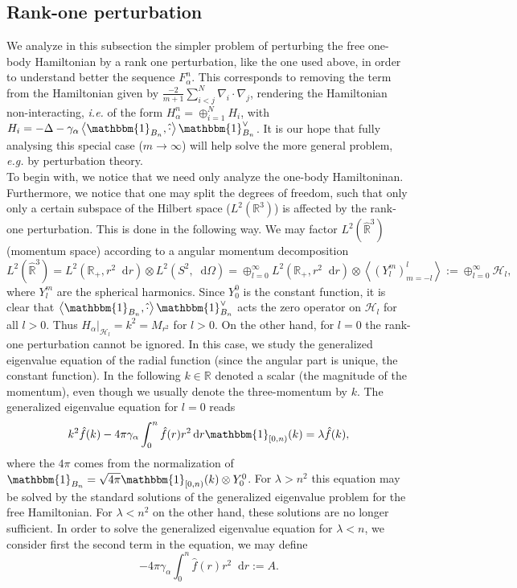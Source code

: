 \documentclass[a4paper,11pt]{article}
\renewcommand{\braket}[1]{\left\langle#1\right\rangle}
\newcommand*\diff{\mathop{}\!\mathrm{d}}
\newcommand{\ie}{\emph{i.e.} }
\newcommand{\eg}{\emph{e.g.} }
\newcommand{\R}{\mathbb{R}}
\numberwithin{equation}{section}
\begin{document}
	\subsection{Rank-one perturbation}\label{SectionRankOnePerturbation}
	We analyze in this subsection the simpler problem of perturbing the free one-body Hamiltonian by a rank one perturbation, like the one used above, in order to understand better the sequence $ F_\alpha^n $. This corresponds to removing the term from the Hamiltonian given by $ \frac{-2}{m+1}\sum_{i<j}^{N}\nabla_i\cdot\nabla_j $, rendering the Hamiltonian non-interacting, \ie of the form $ H_\alpha^n=\oplus_{i=1}^{N}H_i$, with $ H_i=-\Delta-\gamma_\alpha\braket{\mathbbm{1}_{B_n},\hat{\cdot}}\mathbbm{1}_{B_n}^\vee $. It is our hope that fully analysing this special case ($ m\to\infty $) will help solve the more general problem, \eg by perturbation theory.\\
	To begin with, we notice that we need only analyze the one-body Hamiltoninan. Furthermore, we notice that one may split the degrees of freedom, such that only only a certain subspace of the Hilbert space ($ L^2(\R^3) $) is affected by the rank-one perturbation. This is done in the following way. We may factor $ L^2(\hat{\R}^3) $ (momentum space) according to a angular momentum decomposition \begin{equation}
		L^2(\hat{\R}^3)=L^2(\R_+,r^2\diff r)\otimes L^2(S^2,\diff\Omega)=\oplus_{l=0}^{\infty}L^2(\R_+,r^2\diff r)\otimes\braket{(Y^m_l)_{m=-l}^{l}}:=\oplus_{l=0}^{\infty}\mathcal{H}_l,
	\end{equation} 
	where $ Y_l^m $ are the spherical harmonics. Since $ Y_0^0 $ is the constant function, it is clear that $ \braket{\mathbbm{1}_{B_n},\hat{\cdot}}\mathbbm{1}_{B_n}^\vee $ acts the zero operator on $ \mathcal{H}_l $ for all $ l>0 $. Thus $ H_\alpha \rvert_{\mathcal{H}_l}=k^2=M_{r^2} $ for $ l>0 $. On the other hand, for $ l=0 $ the rank-one perturbation cannot be ignored. In this case, we study the generalized eigenvalue equation of the radial function (since the angular part is unique, the constant function). In the following $ k\in\R $ denoted a scalar (the magnitude of the momentum), even though we usually denote the three-momentum by $ k $. The generalized eigenvalue equation for $ l=0 $ reads\begin{equation}\label{GeneralizedEigenvalueEq}
	k^2\hat{f}(k)-4\pi\gamma_\alpha\int_{0}^{n}\hat{f}(r)r^2\diff r\mathbbm{1}_{[0,n)}(k)=\lambda\hat{f}(k),
	\end{equation}
	where the $ 4\pi $ comes from the normalization of $ \mathbbm{1}_{B_n}=\sqrt{4\pi}\mathbbm{1}_{[0,n)}(k)\otimes Y_0^0 $. For $ \lambda>n^2 $ this equation may be solved by the standard solutions of the generalized eigenvalue problem for the free Hamiltonian. For $ \lambda<n^2 $ on the other hand, these solutions are no longer sufficient. In order to solve the generalized eigenvalue equation for $ \lambda<n $, we consider first the second term in the equation, we may define\begin{equation} \label{EqConsistency}
	-4\pi\gamma_\alpha\int_{0}^{n}\hat{f}(r)r^2\diff r:=A.
	\end{equation}
\end{document}
